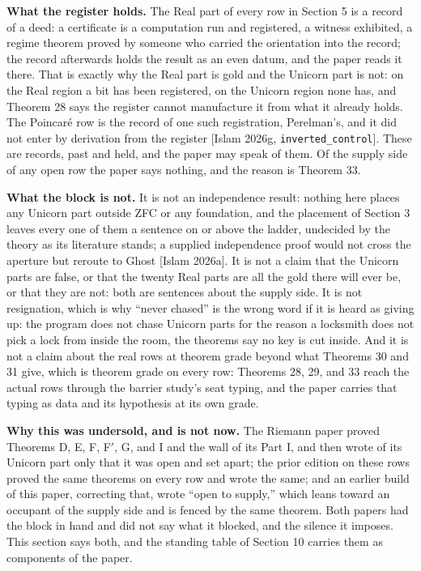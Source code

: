 \documentclass[10pt]{article}
\begin{document}
\textbf{What the register holds.} The Real part of every row in Section
5 is a record of a deed: a certificate is a computation run and
registered, a witness exhibited, a regime theorem proved by someone who
carried the orientation into the record; the record afterwards holds the
result as an even datum, and the paper reads it there. That is exactly
why the Real part is gold and the Unicorn part is not: on the Real
region a bit has been registered, on the Unicorn region none has, and
Theorem 28 says the register cannot manufacture it from what it already
holds. The Poincaré row is the record of one such registration,
Perelman's, and it did not enter by derivation from the register
{[}Islam 2026g, \texttt{inverted\_control}{]}. These are records, past
and held, and the paper may speak of them. Of the supply side of any
open row the paper says nothing, and the reason is Theorem 33.

\textbf{What the block is not.} It is not an independence result:
nothing here places any Unicorn part outside ZFC or any foundation, and
the placement of Section 3 leaves every one of them a sentence on or
above the ladder, undecided by the theory as its literature stands; a
supplied independence proof would not cross the aperture but reroute to
Ghost {[}Islam 2026a{]}. It is not a claim that the Unicorn parts are
false, or that the twenty Real parts are all the gold there will ever
be, or that they are not: both are sentences about the supply side. It
is not resignation, which is why ``never chased'' is the wrong word if
it is heard as giving up: the program does not chase Unicorn parts for
the reason a locksmith does not pick a lock from inside the room, the
theorems say no key is cut inside. And it is not a claim about the real
rows at theorem grade beyond what Theorems 30 and 31 give, which is
theorem grade on every row: Theorems 28, 29, and 33 reach the actual
rows through the barrier study's seat typing, and the paper carries that
typing as data and its hypothesis at its own grade.

\textbf{Why this was undersold, and is not now.} The Riemann paper
proved Theorems D, E, F, F\('\), G, and I and the wall of its Part I,
and then wrote of its Unicorn part only that it was open and set apart;
the prior edition on these rows proved the same theorems on every row
and wrote the same; and an earlier build of this paper, correcting that,
wrote ``open to supply,'' which leans toward an occupant of the supply
side and is fenced by the same theorem. Both papers had the block in
hand and did not say what it blocked, and the silence it imposes. This
section says both, and the standing table of Section 10 carries them as
components of the paper.
\end{document}
